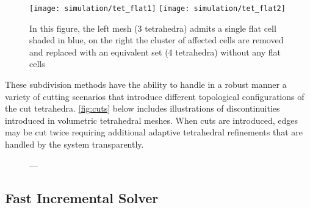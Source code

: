 \begin{figure}
  \centering%
  \texttt{[image: simulation/tet\_flat1]}
  \label{fig:tet_flat1}
  \hspace{10ex}
  \texttt{[image: simulation/tet\_flat2]}
  \label{fig:tet_flat2}
  \caption{In this figure, the left mesh (3 tetrahedra) admits a single flat cell shaded in blue, on the right the cluster of affected cells are removed and replaced with an equivalent set (4 tetrahedra) without any flat cells}
  \label{fig:flat_tet}
\end{figure}



These subdivision methods have the ability to handle in a robust manner a variety of cutting scenarios that introduce different topological configurations of the cut tetrahedra. \autoref{fig:cuts} below includes illustrations of discontinuities introduced in volumetric tetrahedral meshes.  When cuts are introduced, edges may be cut twice requiring additional adaptive tetrahedral refinements that are handled by the system transparently.

\begin{figure}
  \centering%
  \setlength{\fboxsep}{0pt}%
  \setlength{\fboxrule}{0.1pt}%
  \hfill%
  \hfill%
  \caption{---}
  \label{fig:cuts}
\end{figure}


\subsection{Fast Incremental Solver}
\label{ssec:incremental_solver}

